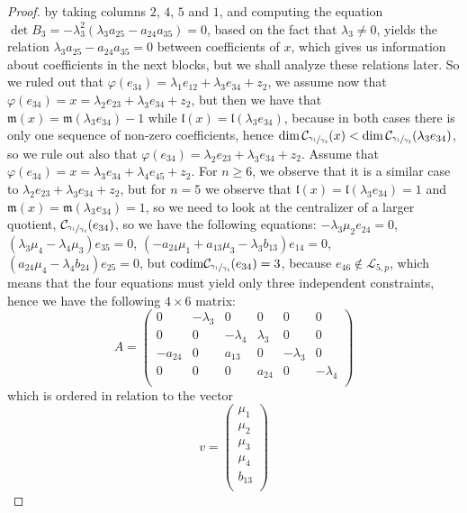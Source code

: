 \documentclass[12pt,fleqn]{article}
\newcommand*\circled[1]{\tikz[baseline=(char.base)]{
            \small \node[shape=circle,draw,inner sep=1pt] (char) {#1};}}
\begin{document}
\begin{proof}
by taking columns $2$, $4$, $5$ and $1$, and computing the equation $\det B_3=-\lambda_3^2(\lambda_3 a_{25}-a_{24}a_{35})=0$, based on the fact that $\lambda_3\neq 0$, yields the relation $\lambda_3 a_{25}-a_{24}a_{35}=0$ between coefficients of $x$, which gives us information about coefficients in the next blocks, but we shall analyze these relations later. So we ruled out that $\varphi(e_{34})=\lambda_1 e_{12}+\lambda_3 e_{34}+z_2$, we assume now that $\varphi(e_{34})=x=\lambda_2 e_{23}+\lambda_3 e_{34}+z_2$, but then we have that $\mathfrak{m}(x)=\mathfrak{m}(\lambda_3 e_{34})-1$ while $\mathfrak{l}(x)=\mathfrak{l}(\lambda_3 e_{34})$, because in both cases there is only one sequence of non-zero coefficients, hence $\dim\mathcal{C}_{\sfrac{\gamma_1}{\gamma_3}}(x)<\dim\mathcal{C}_{\sfrac{\gamma_1}{\gamma_3}}(\lambda_3 e_{34})$, so we rule out also that $\varphi(e_{34})=\lambda_2 e_{23}+\lambda_3 e_{34}+z_2$. Assume that $\varphi(e_{34})=x=\lambda_3 e_{34}+\lambda_4 e_{45}+z_2$. For $n\geq 6$, we observe that it is a similar case to $\lambda_2 e_{23}+\lambda_3 e_{34}+z_2$, but for $n=5$ we observe that $\mathfrak{l}(x)=\mathfrak{l}(\lambda_3 e_{34})=1$ and $\mathfrak{m}(x)=\mathfrak{m}(\lambda_3 e_{34})=1$, so we need to look at the centralizer of a larger quotient, $\mathcal{C}_{\sfrac{\gamma_1}{\gamma_4}}(e_{34})$, so we have the following equations: \circled{1} $-\lambda_3\mu_2 e_{24}=0$, \circled{2} $(\lambda_3\mu_4-\lambda_4\mu_3)e_{35}=0$, $(-a_{24}\mu_1+a_{13}\mu_3-\lambda_3 b_{13})e_{14}=0$, \circled{4} $(a_{24}\mu_4-\lambda_4 b_{24})e_{25}=0$, but $\mathrm{codim}\mathcal{C}_{\sfrac{\gamma_1}{\gamma_4}}(e_{34})=3$, because $e_{46}\notin\mathcal{L}_{5,p}$, which means that the four equations must yield only three independent constraints, hence we have the following $4\times 6$ matrix: \[A=\begin{pmatrix}
0 & -\lambda_3 & 0 & 0 & 0 & 0\\
0 & 0 & -\lambda_4 & \lambda_3 & 0 & 0\\
-a_{24} & 0 & a_{13} & 0 & -\lambda_3 & 0\\
0 & 0 & 0 & a_{24} & 0 & -\lambda_4\\
\end{pmatrix}\]
which is ordered in relation to the vector \[
v=\begin{pmatrix}
\mu_1\\
\mu_2\\
\mu_3\\
\mu_4\\
b_{13}\\

\end{pmatrix}\]
\end{proof}
\end{document}
